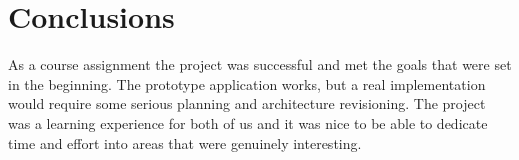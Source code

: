 \section{Conclusions}
As a course assignment the project was successful and met the goals that were set in the beginning. The prototype application works, but a real implementation would require some serious planning and architecture revisioning. The project was a learning experience for both of us and it was nice to be able to dedicate time and effort into areas that were genuinely interesting.

